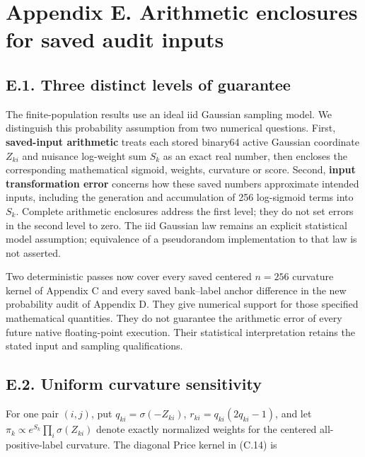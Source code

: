 \documentclass{article}
\begin{document}
\clearpage

\section*{Appendix E. Arithmetic enclosures for saved audit
inputs}\label{appendix-e.-arithmetic-enclosures-for-saved-audit-inputs}

\subsection*{E.1. Three distinct levels of
guarantee}\label{e.1.-three-distinct-levels-of-guarantee}

The finite-population results use an ideal iid Gaussian sampling model.
We distinguish this probability assumption from two numerical questions.
First, \textbf{saved-input arithmetic} treats each stored binary64
active Gaussian coordinate \(Z_{ki}\) and nuisance log-weight sum
\(S_k\) as an exact real number, then encloses the corresponding
mathematical sigmoid, weights, curvature or score. Second, \textbf{input
transformation error} concerns how these saved numbers approximate
intended inputs, including the generation and accumulation of 256
log-sigmoid terms into \(S_k\). Complete arithmetic enclosures address
the first level; they do not set errors in the second level to zero. The
iid Gaussian law remains an explicit statistical model assumption;
equivalence of a pseudorandom implementation to that law is not
asserted.

Two deterministic passes now cover every saved centered \(n=256\)
curvature kernel of Appendix C and every saved bank--label anchor
difference in the new probability audit of Appendix D. They give
numerical support for those specified mathematical quantities. They do
not guarantee the arithmetic error of every future native floating-point
execution. Their statistical interpretation retains the stated input and
sampling qualifications.

\subsection*{E.2. Uniform curvature
sensitivity}\label{e.2.-uniform-curvature-sensitivity}

For one pair \((i,j)\), put \(q_{ki}=\sigma(-Z_{ki})\),
\(r_{ki}=q_{ki}(2q_{ki}-1)\), and let
\(\pi_k\propto e^{S_k}\prod_i\sigma(Z_{ki})\) denote exactly normalized
weights for the centered all-positive-label curvature. The diagonal
Price kernel in (C.14) is
\end{document}
